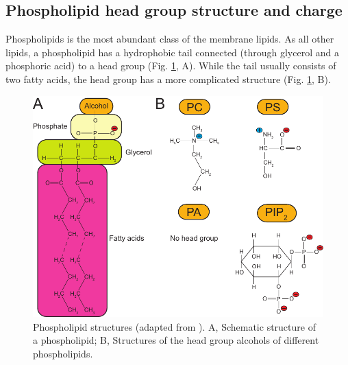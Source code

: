 \subsection{Phospholipid head group structure and charge}

\label{phospholipids}

Phospholipids is the most abundant class of the membrane lipids. As all other lipids, a phospholipid has a hydrophobic tail connected (through glycerol and a phosphoric acid) to a head group (Fig. \ref{fig:phospholipids}, A). While the tail usually consists of two fatty acids, the head group has a more complicated structure (Fig. \ref{fig:phospholipids}, B).

\begin{figure}[!ht]
\begin{center}
  \includegraphics[scale=0.98]{../figures/Phospholipids.pdf}
\end{center}
 \caption[Phospholipid structures]{Phospholipid structures (adapted from \cite{Pollard2008}). A, Schematic structure of a phospholipid; B, Structures of the head group alcohols of different phospholipids.}
\label{fig:phospholipids}
\end{figure}


